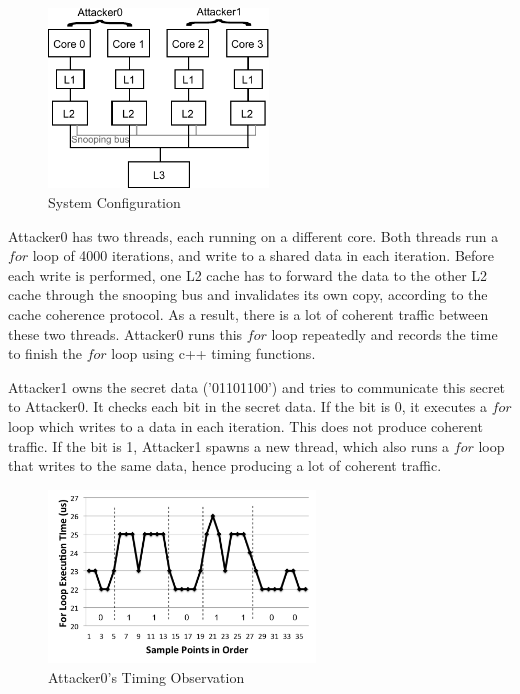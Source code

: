 \begin{figure}
    \begin{center}
        \includegraphics[width=2.3in]{figs/coherent_system.pdf}
        \caption{System Configuration}
        \label{fig:coherent_system}
    \end{center}
\end{figure}

Attacker0 has two threads, each running on a different core. Both threads run a $for$ loop of 4000 iterations, and
write to a shared data in each iteration. Before each write is performed, one L2 cache has to forward the data
to the other L2 cache through the snooping bus and invalidates its own copy, according to the cache coherence protocol. 
As a result, there is a lot of coherent traffic between these two threads. Attacker0 runs this $for$ loop repeatedly and
records the time to finish the $for$ loop using c++ timing functions.

Attacker1 owns the secret data ('01101100') and tries to communicate this secret to Attacker0. It checks each bit
in the secret data. If the bit is 0, it executes a $for$ loop which writes to a data in each iteration. This does not produce 
coherent traffic. If the bit is 1, Attacker1 spawns a new thread, which also runs a $for$ loop that writes to the same data, hence producing a lot of coherent traffic. 

\begin{figure}
    \begin{center}
        \includegraphics[width=2.79in]{figs/coherence_interference.pdf}
        \caption{Attacker0's Timing Observation}
        \label{fig:coherence_interference}
    \end{center}
\end{figure}

